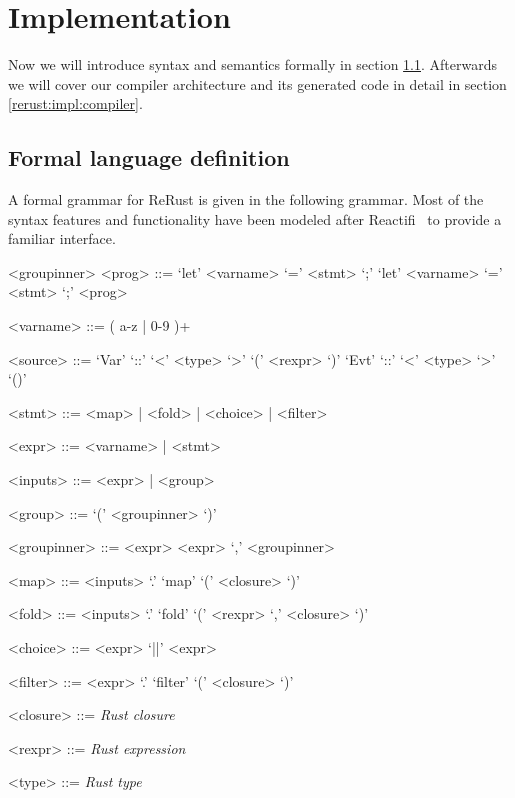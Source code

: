 \section{Implementation}
\label{rerust:impl}

Now we will introduce \rerust syntax and semantics formally in section \ref{rerust:impl:formal}. Afterwards we will cover our compiler architecture and its generated code in detail in section \ref{rerust:impl:compiler}.

\subsection{Formal language definition}
\label{rerust:impl:formal}
A formal grammar for \textsf{ReRust} is given in the following grammar. Most of the syntax features and functionality have been modeled after Reactifi~\citep{reactifi} to provide a familiar interface. 

\begin{indentgrammar}{<groupinner>}
<prog> ::=  `let' <varname> `=' <stmt> `;' 
     \alt `let' <varname> `=' <stmt> `;' <prog>

<varname> ::= ( a-z | 0-9 )+

<source> ::= `Var' `::' `<' <type> `>' `(' <rexpr> `)' \alt `Evt' `::' `<' <type> `>' `()'

<stmt> ::= <map> | <fold> | <choice> | <filter>

<expr> ::= <varname> | <stmt>

<inputs> ::= <expr> | <group>

<group> ::= `(' <groupinner> `)'
    
<groupinner> ::= <expr> \alt <expr> `,' <groupinner>

<map> ::= <inputs> `.' `map' `(' <closure> `)'

<fold> ::= <inputs> `.' `fold' `(' <rexpr> `,' <closure> `)'

<choice> ::= <expr> `||' <expr>

<filter> ::= <expr> `.' `filter' `(' <closure> `)'

<closure> ::= \emph{Rust closure}

<rexpr> ::= \emph{Rust expression}

<type> ::= \emph{Rust type}
\end{indentgrammar}

